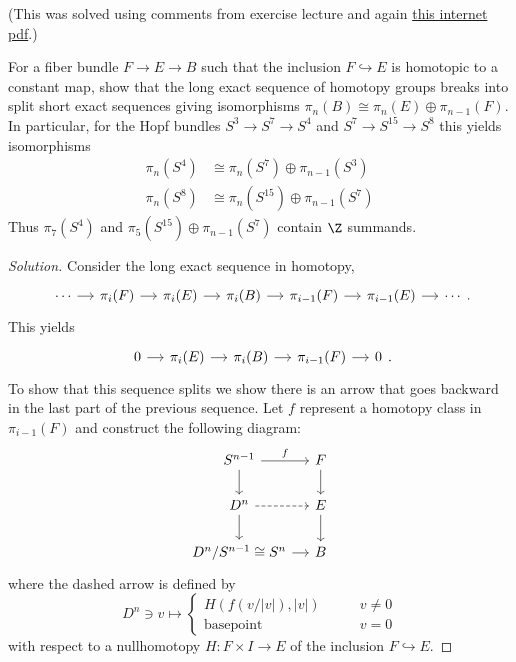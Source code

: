 \begin{exercise}[4.2.31]
	(This was solved using comments from exercise lecture and again \href{https://pages.uoregon.edu/njp/hw7solutions.pdf}{this internet pdf}.)

	For a fiber bundle $F\to E\to B$ such that the inclusion $F\hookrightarrow E$ is homotopic to a constant map, show that the long exact sequence of homotopy groups breaks into split short exact sequences giving isomorphisms $\pi_n(B)\cong \pi_n(E)\oplus\pi_{n-1}(F)$. In particular, for the Hopf bundles $S^3\to S^7\to S^4$ and $S^7\to S^{15}\to S^8$  this yields isomorphisms
	\begin{align*}
		\pi_n(S^4)&\cong \pi_n(S^7)\oplus\pi_{n-1}(S^3)\\
		\pi_n(S^8)&\cong \pi_n(S^{15})\oplus\pi_{n-1}(S^7)
	\end{align*}
	Thus $\pi_{7}(S^4)$ and $\pi_{5}(S^{15})\oplus\pi_{n-1}(S^7)$  contain $\Z$  summands.	
\end{exercise}
\begin{proof}[Solution]
	Consider the long exact sequence in homotopy,
	\[
		\begin{tikzcd}[column sep=small]
				\cdots\arrow[r]&\pi_i(F)\arrow[r]&\pi_i(E)\arrow[r]&\pi_i(B)\arrow[r]&\pi_{i-1}(F)\arrow[r]&\pi_{i-1}(E)\arrow[r]&\cdots
		\end{tikzcd}
	.\]
This yields
\[
\begin{tikzcd}[column sep=small]
	0\arrow[r]&\pi_i(E)\arrow[r]&\pi_i(B)\arrow[r]&\pi_{i-1}(F)\arrow[r]&0
\end{tikzcd}
.\]
To show that this sequence splits we show there is an arrow that goes backward in the last part of the previous sequence. Let $f$ represent a homotopy class in $\pi_{i-1}(F)$ and construct the following diagram:
\[\begin{tikzcd}[column sep=small]
	S^{n-1}\arrow[r,"f"]\arrow[d]&F\arrow[d]\\
	D^n\arrow[d]\arrow[r,dashed]&E\arrow[d]\\
	D^n/S^{n-1}\cong S^n\arrow[r]&B
\end{tikzcd}\]
where the dashed arrow is defined by
\[D^{n} \ni v\mapsto \begin{cases}
	H(f(v/|v|),|v|)\qquad &v\neq 0\\
	\text{basepoint} \qquad &v=0
\end{cases}\]
with respect to a nullhomotopy $H:F\times I\to E$ of the inclusion $F\hookrightarrow E$.
\end{proof}


